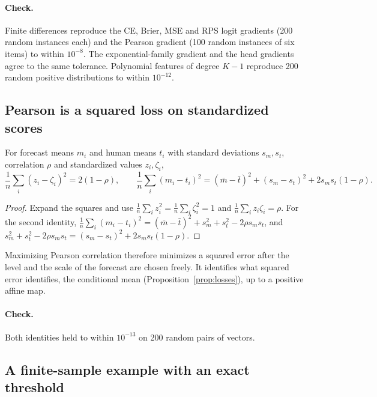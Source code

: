 \paragraph{Check.}
Finite differences reproduce the CE, Brier, MSE and RPS logit gradients (200 random instances each) and the Pearson gradient (100 random instances of six items) to within $10^{-8}$.
The exponential-family gradient and the head gradients agree to the same tolerance.
Polynomial features of degree $K-1$ reproduce 200 random positive distributions to within $10^{-12}$.

\subsection{Pearson is a squared loss on standardized scores}
\label{app:moments-squared}

\begin{proposition}
\label{prop:squared}
For forecast means $m_i$ and human means $t_i$ with standard deviations $s_m,s_t$, correlation $\rho$ and standardized values $z_i,\zeta_i$,
\[
\frac1n\sum_i(z_i-\zeta_i)^2=2(1-\rho),
\qquad
\frac1n\sum_i(m_i-t_i)^2=(\bar m-\bar t)^2+(s_m-s_t)^2+2s_ms_t(1-\rho).
\]
\end{proposition}

\begin{proof}
Expand the squares and use $\frac1n\sum_iz_i^2=\frac1n\sum_i\zeta_i^2=1$ and $\frac1n\sum_iz_i\zeta_i=\rho$.
For the second identity, $\frac1n\sum_i(m_i-t_i)^2=(\bar m-\bar t)^2+s_m^2+s_t^2-2\rho s_ms_t$, and $s_m^2+s_t^2-2\rho s_ms_t=(s_m-s_t)^2+2s_ms_t(1-\rho)$.
\end{proof}

Maximizing Pearson correlation therefore minimizes a squared error after the level and the scale of the forecast are chosen freely.
It identifies what squared error identifies, the conditional mean (Proposition~\ref{prop:losses}), up to a positive affine map.

\paragraph{Check.}
Both identities held to within $10^{-13}$ on 200 random pairs of vectors.

\subsection{A finite-sample example with an exact threshold}
\label{app:moments-threshold}

